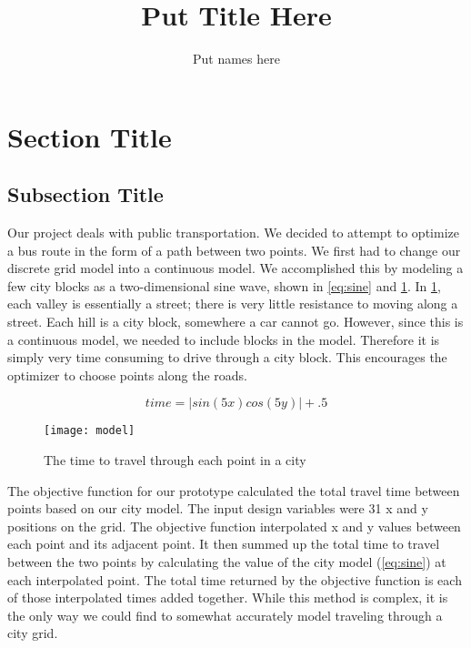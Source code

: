 \documentclass{article}
\begin{document}
\title{Put Title Here}
\author{Put names here}
\maketitle

\section{Section Title}
\subsection{Subsection Title}

Our project deals with public transportation. We decided to attempt to optimize a bus route in the form of a path between two points. We first had to change our discrete grid model into a continuous model. We accomplished this by modeling a few city blocks as a two-dimensional sine wave, shown in \cref{eq:sine} and \cref{fig:model}. In \cref{fig:model}, each valley is essentially a street; there is very little resistance to moving along a street. Each hill is a city block, somewhere a car cannot go. However, since this is a continuous model, we needed to include blocks in the model. Therefore it is simply very time consuming to drive through a city block. This encourages the optimizer to choose points along the roads.

\begin{equation}
    time = |sin(5x) cos(5y)| + .5
    \label{eq:sine}
\end{equation}

\begin{figure}[htpb]
\centering
\texttt{[image: model]}
\caption{The time to travel through each point in a city}
\label{fig:model}
\end{figure}

The objective function for our prototype calculated the total travel time between points based on our city model. The input design variables were 31 x and y positions on the grid. The objective function interpolated x and y values between each point and its adjacent point. It then summed up the total time to travel between the two points by calculating the value of the city model (\cref{eq:sine}) at each interpolated point. The total time returned by the objective function is each of those interpolated times added together. While this method is complex, it is the only way we could find to somewhat accurately model traveling through a city grid.
\end{document}
